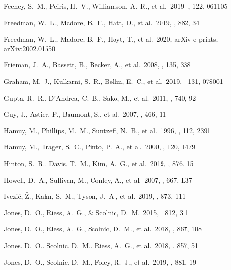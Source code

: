 \documentclass[]{aa}
\begin{document}
\begin{thebibliography}{}

 Feeney, S.~M., Peiris, H.~V.,
Williamson, A.~R., et al.\ 2019, \prl, 122, 061105

 Freedman, W.~L., Madore, B.~F.,
Hatt, D., et al.\ 2019, \apj, 882, 34

 Freedman, W.~L., Madore, B.~F.,
Hoyt, T., et al.\ 2020, arXiv e-prints, arXiv:2002.01550

 Frieman, J.~A., Bassett, B., Becker,
A., et al.\ 2008, \aj, 135, 338


 Graham, M.~J., Kulkarni, S.~R., Bellm,
E.~C., et al.\ 2019, \pasp, 131, 078001

 Gupta, R.~R., D'Andrea, C.~B., Sako, M.,
et al.\ 2011, \apj, 740, 92

 Guy, J., Astier, P., Baumont, S., et al.\
2007, \aap, 466, 11


 Hamuy, M., Phillips, M.~M., Suntzeff,
N.~B., et al.\ 1996, \aj, 112, 2391

 Hamuy, M., Trager, S.~C., Pinto, P.~A.,
et al.\ 2000, \aj, 120, 1479

 Hinton, S.~R., Davis, T.~M., Kim,
A.~G., et al.\ 2019, \apj, 876, 15

 Howell, D.~A., Sullivan, M., Conley,
A., et al.\ 2007, \apjl, 667, L37


 Ivezi{\'c}, {\v{Z}}., Kahn, S.~M.,
Tyson, J.~A., et al.\ 2019, \apj, 873, 111


 Jones, D.~O., Riess, A.~G., \& Scolnic,
D.~M.\ 2015, \apj, 812, 3 1

 Jones, D.~O., Riess, A.~G., Scolnic,
D.~M., et al.\ 2018, \apj, 867, 108

 Jones, D.~O., Scolnic, D.~M., Riess,
A.~G., et al.\ 2018, \apj, 857, 51

 Jones, D.~O., Scolnic, D.~M., Foley,
R.~J., et al.\ 2019, \apj, 881, 19


\end{thebibliography}
\end{document}
